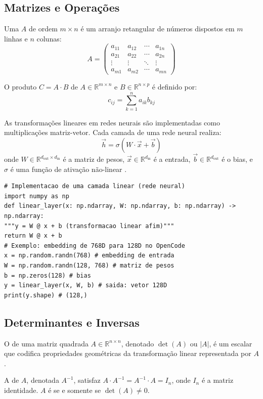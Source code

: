 \subsection{Matrizes e Operações}
\begin{definicao}[Matriz]
Uma  $A$ de ordem $m \times n$ é um arranjo retangular
de números dispostos em $m$ linhas e $n$ colunas:
\[A = \begin{pmatrix}
a_{11} & a_{12} & \cdots & a_{1n} \\
a_{21} & a_{22} & \cdots & a_{2n} \\
\vdots & \vdots & \ddots & \vdots \\
a_{m1} & a_{m2} & \cdots & a_{mn}
\end{pmatrix}
\]
\end{definicao}
\begin{definicao}
O produto $C = A \cdot B$ de $A \in \mathbb{R}^{m \times n}$ e
$B \in \mathbb{R}^{n \times p}$ é definido por:
\[c_{ij} = \sum_{k=1}^{n} a_{ik} b_{kj}
\]
\end{definicao}
\begin{exemplo}
As transformações lineares em redes neurais são implementadas como
multiplicações matriz-vetor. Cada camada de uma rede neural realiza:
\[\vec{h} = \sigma(W \cdot \vec{x} + \vec{b})
\]
onde $W \in \mathbb{R}^{d_{\text{out}} \times d_{\text{in}}}$ é a matriz
de pesos, $\vec{x} \in \mathbb{R}^{d_{\text{in}}}$ é a entrada,
$\vec{b} \in \mathbb{R}^{d_{\text{out}}}$ é o bias, e $\sigma$ é uma
função de ativação não-linear \cite{goodfellow2016deep}.
\end{exemplo}
\begin{lstlisting}[style=pythonstyle]
# Implementacao de uma camada linear (rede neural)
import numpy as np
def linear_layer(x: np.ndarray, W: np.ndarray, b: np.ndarray) -> np.ndarray:
"""y = W @ x + b (transformacao linear afim)"""
return W @ x + b
# Exemplo: embedding de 768D para 128D no OpenCode
x = np.random.randn(768) # embedding de entrada
W = np.random.randn(128, 768) # matriz de pesos
b = np.zeros(128) # bias
y = linear_layer(x, W, b) # saida: vetor 128D
print(y.shape) # (128,)
\end{lstlisting}
\subsection{Determinantes e Inversas}
\begin{definicao}[Determinante]
O  de uma matriz quadrada $A \in \mathbb{R}^{n \times n}$,
denotado $\det(A)$ ou $|A|$, é um escalar que codifica propriedades
geométricas da transformação linear representada por $A$.
\end{definicao}
\begin{definicao}
A  de $A$, denotada $A^{-1}$, satisfaz
$A \cdot A^{-1} = A^{-1} \cdot A = I_n$, onde $I_n$ é a matriz
identidade. $A$ é  se e somente se $\det(A) \neq 0$.
\end{definicao}
